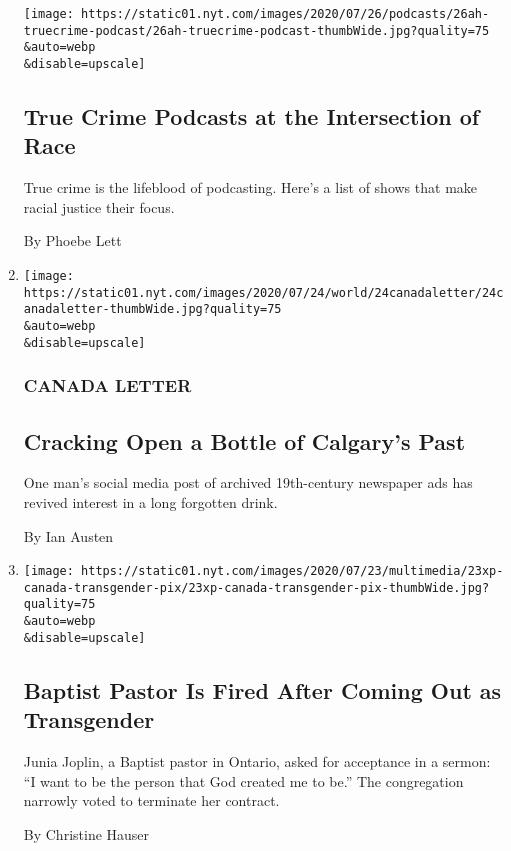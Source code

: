\begin{enumerate}
  \texttt{[image: https://static01.nyt.com/images/2020/07/26/podcasts/26ah-truecrime-podcast/26ah-truecrime-podcast-thumbWide.jpg?quality=75\\\&auto=webp\\\&disable=upscale]}

  \hypertarget{true-crime-podcasts-at-the-intersection-of-race}{%
  \subsection{True Crime Podcasts at the Intersection of
  Race}\label{true-crime-podcasts-at-the-intersection-of-race}}

  True crime is the lifeblood of podcasting. Here's a list of shows that
  make racial justice their focus.

  By Phoebe Lett
\item
  \href{/2020/07/24/world/canada/cronk.html}{}

  \texttt{[image: https://static01.nyt.com/images/2020/07/24/world/24canadaletter/24canadaletter-thumbWide.jpg?quality=75\\\&auto=webp\\\&disable=upscale]}

  \hypertarget{canada-letter-1}{%
  \subsubsection{CANADA LETTER}\label{canada-letter-1}}

  \hypertarget{cracking-open-a-bottle-of-calgarys-past}{%
  \subsection{Cracking Open a Bottle of Calgary's
  Past}\label{cracking-open-a-bottle-of-calgarys-past}}

  One man's social media post of archived 19th-century newspaper ads has
  revived interest in a long forgotten drink.

  By Ian Austen
\item
  \href{/2020/07/23/world/canada/junia-joplin-transgender-lorne-park-baptist.html}{}

  \texttt{[image: https://static01.nyt.com/images/2020/07/23/multimedia/23xp-canada-transgender-pix/23xp-canada-transgender-pix-thumbWide.jpg?quality=75\\\&auto=webp\\\&disable=upscale]}

  \hypertarget{baptist-pastor-is-fired-after-coming-out-as-transgender}{%
  \subsection{Baptist Pastor Is Fired After Coming Out as
  Transgender}\label{baptist-pastor-is-fired-after-coming-out-as-transgender}}

  Junia Joplin, a Baptist pastor in Ontario, asked for acceptance in a
  sermon: ``I want to be the person that God created me to be.'' The
  congregation narrowly voted to terminate her contract.

  By Christine Hauser
\end{enumerate}

